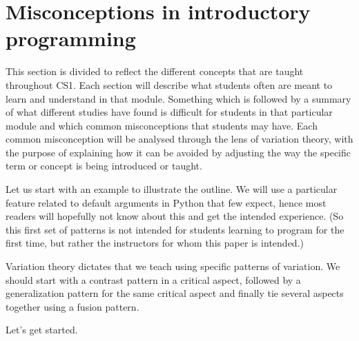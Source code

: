 \section{Misconceptions in introductory programming}
\label{misconceptions}

This section is divided to reflect the different concepts that are taught 
throughout CS1. Each section will describe what students often are meant to 
learn and understand in that module. Something which is followed by a 
summary 
of what different studies have found is difficult for students in that 
particular
module and which common misconceptions that students may have. Each common 
misconception will be analysed through the lens of variation theory, with 
the purpose of explaining how it can be avoided by adjusting the way 
the specific term or concept is being introduced or taught.

Let us start with an example to illustrate the outline.
We will use a particular feature related to default arguments in Python that 
few expect, hence most readers will hopefully not know about this and get the 
intended experience.
(So this first set of patterns is not intended for students learning to program 
for the first time, but rather the instructors for whom this paper is 
intended.)

Variation theory dictates that we teach using specific patterns of variation.
We should start with a contrast pattern in a critical aspect, followed by a 
generalization pattern for the same critical aspect and finally tie several 
aspects together using a fusion pattern.

Let's get started.

